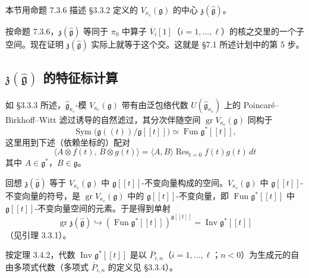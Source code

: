 本节用命题 7.3.6 描述 §3.3.2 定义的 $V_{\kappa_c}(\mathfrak g)$ 的中心 $\mathfrak z(\hat{\mathfrak g})$。

按命题 7.3.6，$\mathfrak z(\hat{\mathfrak g})$ 等同于 $\pi_0$ 中算子 $\overline V_i[1]$（$i=1,\dots,\ell$）的核之交里的一个子空间。现在证明 $\mathfrak z(\hat{\mathfrak g})$ 实际上就等于这个交。这就是 §7.1 所述计划中的第 5 步。

\subsection{$\mathfrak z(\hat{\mathfrak g})$ 的特征标计算}

如 §3.3.3 所述，$\hat{\mathfrak g}_{\kappa_c}$-模 $V_{\kappa_c}(\mathfrak g)$ 带有由泛包络代数 $U(\hat{\mathfrak g}_{\kappa_c})$ 上的 Poincaré–Birkhoff–Witt 滤过诱导的自然滤过，其分次伴随空间 $\operatorname{gr}V_{\kappa_c}(\mathfrak g)$ 同构于
\[
    \operatorname{Sym}\bigl(\mathfrak g((t))/\mathfrak g[\![t]\!]\bigr)\simeq\operatorname{Fun}\mathfrak g^*[\![t]\!],
\]
这里用到下述（依赖坐标的）配对
\begin{equation}
    \langle A\otimes f(t),\,B\otimes g(t)\rangle=\langle A,B\rangle\operatorname{Res}_{t=0}f(t)g(t)\,dt
    \tag{8.1-1}
\end{equation}
其中 $A\in\mathfrak g^*$，$B\in\mathfrak g$。

回想 $\mathfrak z(\hat{\mathfrak g})$ 等于 $V_{\kappa_c}(\mathfrak g)$ 中 $\mathfrak g[\![t]\!]$-不变向量构成的空间。$V_{\kappa_c}(\mathfrak g)$ 中 $\mathfrak g[\![t]\!]$-不变向量的符号，是 $\operatorname{gr}V_{\kappa_c}(\mathfrak g)$ 中的 $\mathfrak g[\![t]\!]$-不变向量，即 $\operatorname{Fun}\mathfrak g^*[\![t]\!]$ 中 $\mathfrak g[\![t]\!]$-不变向量空间的元素。于是得到单射
\begin{equation}
    \operatorname{gr}\mathfrak z(\hat{\mathfrak g})\hookrightarrow(\operatorname{Fun}\mathfrak g^*[\![t]\!])^{\mathfrak g[\![t]\!]}=\operatorname{Inv}\mathfrak g^*[\![t]\!]
    \tag{8.1-2}
\end{equation}
（见引理 3.3.1）。

按定理 3.4.2，代数 $\operatorname{Inv}\mathfrak g^*[\![t]\!]$ 是以 $\overline P_{i,n}$（$i=1,\dots,\ell$；$n<0$）为生成元的自由多项式代数（多项式 $\overline P_{i,n}$ 的定义见 §3.3.4）。

